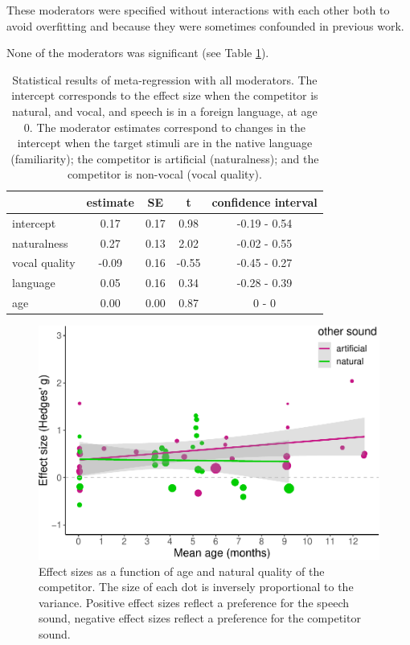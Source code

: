 \documentclass[
  english,
  man]{apa6}
\begin{document}
These moderators were specified without interactions with each other both to avoid overfitting and because they were sometimes confounded in previous work.

None of the moderators was significant (see Table \ref{tab:Table2}).

\begin{table}[tbp]

\begin{center}
\begin{threeparttable}

\caption{\label{tab:Table2}Statistical results of meta-regression with all moderators. The intercept corresponds to the effect size when the competitor is natural, and vocal, and speech is in a foreign language, at age 0. The moderator estimates correspond to changes in the intercept when the target stimuli are in the native language (familiarity); the competitor is artificial (naturalness); and the competitor is non-vocal (vocal quality).}

\begin{tabular}{lcccc}
\toprule
 & estimate & SE & t & confidence interval\\
\midrule
intercept & 0.17 & 0.17 & 0.98 & -0.19 - 0.54\\
naturalness & 0.27 & 0.13 & 2.02 & -0.02 - 0.55\\
vocal quality & -0.09 & 0.16 & -0.55 & -0.45 - 0.27\\
language & 0.05 & 0.16 & 0.34 & -0.28 - 0.39\\
age & 0.00 & 0.00 & 0.87 & 0 - 0\\
\bottomrule
\end{tabular}

\end{threeparttable}
\end{center}

\end{table}

\begin{figure}
\centering
\includegraphics{MA_speech_pref_files/figure-latex/natural-1.pdf}
\caption{\label{fig:natural}Effect sizes as a function of age and natural quality of the competitor. The size of each dot is inversely proportional to the variance. Positive effect sizes reflect a preference for the speech sound, negative effect sizes reflect a preference for the competitor sound.}
\end{figure}
\end{document}
